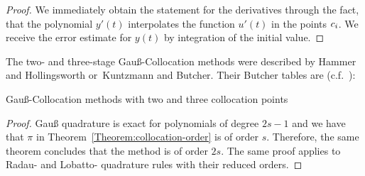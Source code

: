 \begin{proof}
  We immediately obtain the statement for the derivatives through
  the fact, that the polynomial $y'(t)$ interpolates the function $u'(t)$ 
  in the points $c_i$. We receive the error estimate for $y(t)$
  by integration of the initial value. 
\end{proof}




\begin{example}
  The two- and three-stage Gauß-Collocation methods were described by
  Hammer and Hollingsworth or\ Kuntzmann and Butcher. 
	Their Butcher tables are (c.f.~\cite[Tables
  7.3, 7.4]{HairerNorsettWanner93}):
  \begin{table}[tp]
    \begin{minipage}[t]{.49\linewidth}
      
    \end{minipage}
    \begin{minipage}[t]{.49\linewidth}
            
    \end{minipage}
    \caption{Gauß-Collocation methods with two and three collocation points}
    \label{tab:gauss-collokation-2-3}
  \end{table}
\end{example}



\begin{proof}
  Gauß quadrature is exact for polynomials of degree $2s-1$ and we
  have that $\pi$ in Theorem~\ref{Theorem:collocation-order} is of
  order $s$. Therefore, the same theorem concludes that the method is
  of order $2s$. The same proof applies to Radau- and Lobatto-
  quadrature rules with their reduced orders.
\end{proof}



